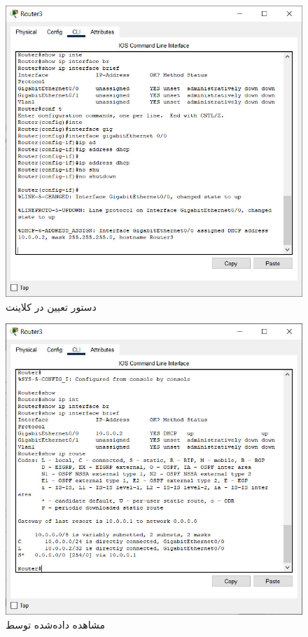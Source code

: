 \documentclass{article}
\begin{document}
\begin{figure}[h!]
	\centering
	\includegraphics[width=0.5\columnwidth]{figs/s-3-router-client.jpg}
	\caption{دستور تعیین  در کلاینت}
	\label{fig:s-3-router-client}
\end{figure}

\begin{figure}[h!]
	\centering
	\includegraphics[width=0.5\columnwidth]{figs/s-3-router-client-brief.jpg}
	\caption{مشاهده  داده‌شده توسط }
	\label{fig:s-3-router-client-brief}
\end{figure}
\end{document}
